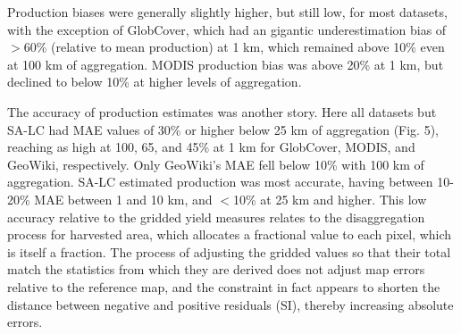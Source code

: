 \documentclass{pnastwo}
\begin{document}
\begin{article}
Production biases were generally slightly higher, but still low, for most datasets, with the exception of GlobCover, which had an gigantic underestimation bias of $>$60\% (relative to mean production) at 1 km, which remained above 10\% even at 100 km of aggregation. MODIS production bias was above 20\% at 1 km, but declined to below 10\% at higher levels of aggregation.  

The accuracy of production estimates was another story. Here all datasets but SA-LC had MAE values of 30\% or higher below 25 km of aggregation (Fig. 5), reaching as high at 100, 65, and 45\% at 1 km for GlobCover, MODIS, and GeoWiki, respectively. Only GeoWiki's MAE fell below 10\% with 100 km of aggregation.  SA-LC estimated production was most accurate, having between 10-20\% MAE between 1 and 10 km, and $<$10\% at 25 km and higher.  This low accuracy relative to the gridded yield measures relates to the disaggregation process for harvested area, which allocates a fractional value to each pixel, which is itself a fraction.  The process of adjusting the gridded values so that their total match the statistics from which they are derived does not adjust map errors relative to the reference map, and the constraint in fact appears to shorten the distance between negative and positive residuals (SI), thereby increasing absolute errors.  


\end{article}
\end{document}
